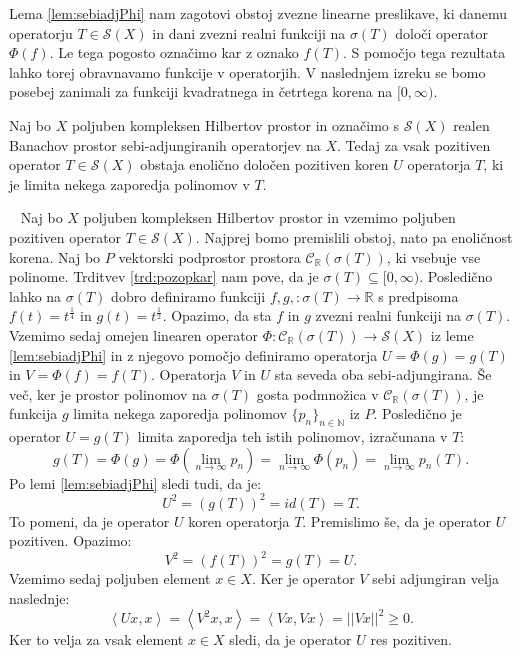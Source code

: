 \documentclass[12pt,a4paper,oneside,fleqn,openany]{book}
\newcommand{\eopf}{\raisebox{0.8ex}{\framebox{}}} %
\newenvironment{dokaz}%
{\noindent{\bf Dokaz.}\ }%
{\hfill\eopf\par\bigskip}%
\newcommand{\R}{\mathbb{R}}
\newcommand{\N}{\mathbb{N}}
\newcommand{\abs}[1]{\ensuremath{\lvert #1 \rvert}}
\newcommand{\norm}[1]{\abs{\abs{#1}}}
\newcommand{\Sp}[2]{\ensuremath{\left<#1, #2\right>}}
\newcommand{\map}[3]{\ensuremath{{#1}:{#2}\rightarrow{#3}}}
\begin{document}
Lema \ref{lem:sebiadjPhi} nam zagotovi obstoj zvezne linearne preslikave, ki danemu operatorju $T\in\mathcal{S}(X)$ in dani zvezni realni funkciji na $\sigma(T)$ določi operator $\Phi(f)$. Le tega pogosto označimo kar z oznako $f(T)$. S pomočjo tega rezultata lahko torej obravnavamo funkcije v operatorjih. V naslednjem izreku se bomo posebej zanimali za funkciji kvadratnega in četrtega korena na $[0, \infty)$.
\begin{izrek}
	\label{izr:pozroot}
	Naj bo $X$ poljuben kompleksen Hilbertov prostor in označimo s $\mathcal{S}(X)$ realen Banachov prostor sebi-adjungiranih operatorjev na $X$. Tedaj za vsak pozitiven operator $T\in\mathcal{S}(X)$ obstaja enolično določen pozitiven koren $U$ operatorja $T$, ki je limita nekega zaporedja polinomov v $T$.
\end{izrek}
\begin{dokaz}
	Naj bo $X$ poljuben kompleksen Hilbertov prostor in vzemimo poljuben pozitiven operator $T\in\mathcal{S}(X)$. Najprej bomo premislili obstoj, nato pa enoličnost korena.
	Naj bo $P$ vektorski podprostor prostora $\mathcal{C}_\R(\sigma(T))$, ki vsebuje vse polinome. Trditvev \ref{trd:pozopkar} nam pove, da je $\sigma(T)\subseteq [0, \infty)$. Posledično lahko na $\sigma(T)$ dobro definiramo funkciji $\map{f, g, }{\sigma(T)}{\R}$ s predpisoma $f(t) = t^{\frac{1}{4}}$ in $g(t)=t^{\frac{1}{2}}$. Opazimo, da sta $f$ in $g$ zvezni realni funkciji na $\sigma(T)$. Vzemimo sedaj omejen linearen operator $\map{\Phi}{\mathcal{C}_\R(\sigma(T))}{\mathcal{S}(X)}$ iz leme \ref{lem:sebiadjPhi} in z njegovo pomočjo definiramo operatorja $U = \Phi(g)=g(T)$ in $V = \Phi(f)=f(T)$. Operatorja $V$ in $U$ sta seveda oba sebi-adjungirana. Še več, ker je prostor polinomov na $\sigma(T)$ gosta podmnožica v $\mathcal{C}_\R(\sigma(T))$, je funkcija $g$ limita nekega zaporedja polinomov $\{p_n\}_{n\in\N}$ iz $P$. Posledično je operator $U=g(T)$ limita zaporedja teh istih polinomov, izračunana v $T$: $$g(T)=\Phi(g)=\Phi\left(\lim_{n\to \infty}p_n\right)=\lim_{n\to \infty}\Phi(p_n)=\lim_{n\to \infty}p_n(T).$$ Po lemi \ref{lem:sebiadjPhi} sledi tudi, da je: $$U^2 = (g(T))^2 = id(T) = T.$$ To pomeni, da je operator $U$ koren operatorja $T$. Premislimo še, da je operator $U$ pozitiven. Opazimo: $$V^2 = (f(T))^2 = g(T) = U.$$ Vzemimo sedaj poljuben element $x\in X$. Ker je operator $V$ sebi adjungiran velja naslednje: $$\Sp{Ux}{x} = \Sp{V^2x}{x} = \Sp{Vx}{Vx} = \norm{Vx}^2 \geq 0.$$
	Ker to velja za vsak element $x\in X$ sledi, da je operator $U$ res pozitiven.
	

\end{dokaz}
\end{document}
